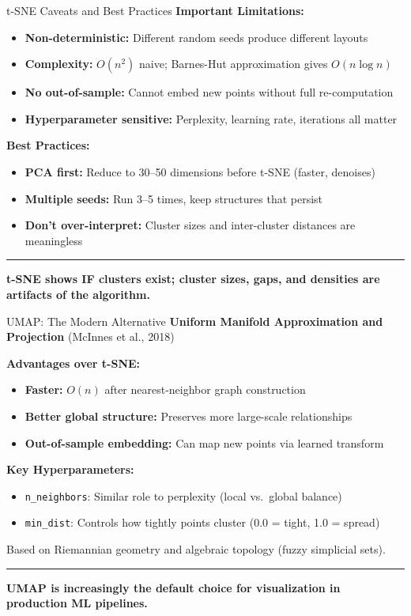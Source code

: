 \documentclass[8pt,aspectratio=169]{beamer}
\newcommand{\bottomnote}[1]{%
\vfill
\vspace{-2mm}
\textcolor{mllavender2}{\rule{\textwidth}{0.4pt}}
\vspace{1mm}
\footnotesize
\textbf{#1}
}
\begin{document}
\begin{frame}[t]{t-SNE Caveats and Best Practices}
\textbf{Important Limitations:}
\begin{itemize}
  \item \textbf{Non-deterministic:} Different random seeds produce different layouts
  \item \textbf{Complexity:} $O(n^2)$ naive; Barnes-Hut approximation gives $O(n \log n)$
  \item \textbf{No out-of-sample:} Cannot embed new points without full re-computation
  \item \textbf{Hyperparameter sensitive:} Perplexity, learning rate, iterations all matter
\end{itemize}

\vspace{0.3em}
\textbf{Best Practices:}
\begin{itemize}
  \item \textbf{PCA first:} Reduce to 30--50 dimensions before t-SNE (faster, denoises)
  \item \textbf{Multiple seeds:} Run 3--5 times, keep structures that persist
  \item \textbf{Don't over-interpret:} Cluster sizes and inter-cluster distances are meaningless
\end{itemize}
\bottomnote{t-SNE shows IF clusters exist; cluster sizes, gaps, and densities are artifacts of the algorithm.}
\end{frame}

\begin{frame}[t]{UMAP: The Modern Alternative}
\textbf{Uniform Manifold Approximation and Projection} (McInnes et al., 2018)

\vspace{0.3em}
\textbf{Advantages over t-SNE:}
\begin{itemize}
  \item \textbf{Faster:} $O(n)$ after nearest-neighbor graph construction
  \item \textbf{Better global structure:} Preserves more large-scale relationships
  \item \textbf{Out-of-sample embedding:} Can map new points via learned transform
\end{itemize}

\vspace{0.3em}
\textbf{Key Hyperparameters:}
\begin{itemize}
  \item \texttt{n\_neighbors}: Similar role to perplexity (local vs.\ global balance)
  \item \texttt{min\_dist}: Controls how tightly points cluster (0.0 = tight, 1.0 = spread)
\end{itemize}

\vspace{0.3em}
Based on Riemannian geometry and algebraic topology (fuzzy simplicial sets).
\bottomnote{UMAP is increasingly the default choice for visualization in production ML pipelines.}
\end{frame}
\end{document}
